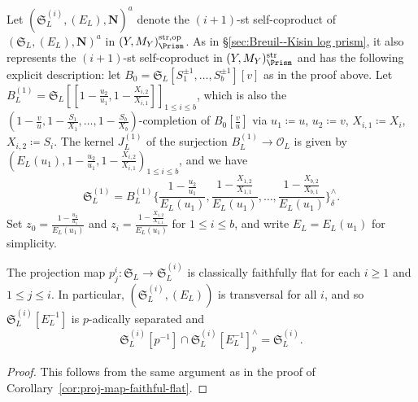 Let $(\mathfrak{S}_L^{(i)}, (E_L), \mathbf{N})^a$ denote the $(i+1)$-st self-coproduct of $(\mathfrak{S}_L, (E_L), \mathbf{N})^a$ in $(Y, M_Y)_{\Prism}^{\mathrm{str},\mathrm{op}}$. As in \S\ref{sec:Breuil--Kisin log prism}, it also represents the $(i+1)$-st self-coproduct in $(Y, M_Y)_{\Prism}^{\mathrm{str}}$ and has the following explicit description: let $B_0 = \mathfrak{S}_L[S_1^{\pm 1}, \ldots, S_b^{\pm 1}][v]$ as in the proof above. Let $B^{(1)}_L = \mathfrak{S}_L[\![1-\frac{u_2}{u_1}, 1-\frac{X_{i, 2}}{X_{i, 1}}]\!]_{1 \leq i \leq b}$, which is also the $(1-\frac{v}{u}, 1-\frac{S_1}{X_1}, \ldots, 1-\frac{S_b}{X_b})$-completion of $B_0[\frac{v}{u}]$ via $u_1\coloneqq u$, $u_2\coloneqq v$, $X_{i, 1}\coloneqq X_i$, $X_{i, 2} \coloneqq S_i$. The kernel $J_L^{(1)}$ of the surjection $B^{(1)}_L \rightarrow \mathcal{O}_L$ is given by $(E_L(u_1), 1-\frac{u_2}{u_1}, 1-\frac{X_{i, 2}}{X_{i, 1}})_{1 \leq i \leq b}$, and we have
\[
\mathfrak{S}_L^{(1)} = B_L^{(1)}\biggl\{\frac{1-\frac{u_2}{u_1}}{E_L(u_1)}, \frac{1-\frac{X_{1, 2}}{X_{1, 1}}}{E_L(u_1)}, \ldots, \frac{1-\frac{X_{b, 2}}{X_{b, 1}}}{E_L(u_1)}\biggr\}^{\wedge}_{\delta}.
\]
Set $z_0 = \frac{1-\frac{u_2}{u_1}}{E_L(u_1)}$ and $z_i = \frac{1-\frac{X_{1, 2}}{X_{1, 1}}}{E_L(u_1)}$ for $1 \leq i \leq b$, and write $E_L = E_L(u_1)$ for simplicity.

\begin{lem} \label{lem:CDVR-BK-self-products-properties}
The projection map $p^i_j\colon \mathfrak{S}_L \rightarrow \mathfrak{S}_L^{(i)}$ is classically faithfully flat for each $i \geq 1$ and $1 \leq j \leq i$. In particular, $(\mathfrak{S}_L^{(i)},(E_L))$ is transversal for all $i$, and so $\mathfrak{S}_L^{(i)}[E_L^{-1}]$ is $p$-adically separated and
\[
\mathfrak{S}_L^{(i)}[p^{-1}] \cap \mathfrak{S}_L^{(i)}[E_L^{-1}]^{\wedge}_p = \mathfrak{S}_L^{(i)}.
\]
\end{lem}

\begin{proof}
This follows from the same argument as in the proof of Corollary~\ref{cor:proj-map-faithful-flat}.
\end{proof}

